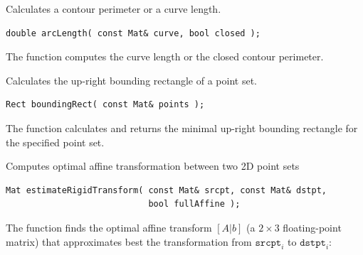 \begin{description}
\label{arcLength}
Calculates a contour perimeter or a curve length.

\begin{lstlisting}
double arcLength( const Mat& curve, bool closed );
\end{lstlisting}
\begin{description}
\end{description}

The function computes the curve length or the closed contour perimeter.

\label{boundingRect}
Calculates the up-right bounding rectangle of a point set.

\begin{lstlisting}
Rect boundingRect( const Mat& points );
\end{lstlisting}
\begin{description}
\end{description}

The function calculates and returns the minimal up-right bounding rectangle for the specified point set.


\label{estimateRigidTransform}
Computes optimal affine transformation between two 2D point sets

\begin{lstlisting}
Mat estimateRigidTransform( const Mat& srcpt, const Mat& dstpt,
                            bool fullAffine );
\end{lstlisting}
\begin{description}
\end{description}

The function finds the optimal affine transform $[A|b]$ (a $2 \times 3$ floating-point matrix) that approximates best the transformation from $\texttt{srcpt}_i$ to $\texttt{dstpt}_i$:


\end{description}
